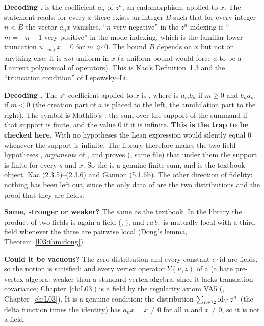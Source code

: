 \begin{dictionary}
\textbf{Decoding .}  is the coefficient $a_n$ of $z^n$, an endomorphism, applied to $x$.
The statement reads: for every $x$ there exists an integer $B$ such that for every integer $n<B$ the vector
$a_nx$ vanishes. ``$n$ very negative'' in the $z^n$-indexing is ``$m=-n-1$ very positive'' in the mode
indexing, which is the familiar lower truncation $u_{(m)}x = 0$ for $m\gg0$. The bound $B$ depends on $x$ but
not on anything else; it is \emph{not} uniform in $x$ (a uniform bound would force $a$ to be a Laurent
polynomial of operators). This is Kac's Definition~1.3 and the ``truncation condition'' of Lepowsky--Li.

\textbf{Decoding .} The $z^s$-coefficient applied to $x$ is
, where  is $a_mb_n$ if $m\ge0$ and
$b_na_m$ if $m<0$ (the creation part of $a$ is placed to the left, the annihilation part to the right).
The symbol  is Mathlib's : the sum over the support of the summand if that support is
finite, and the value $0$ if it is infinite. \textbf{This is the trap to be checked here.} With no hypotheses
the Lean expression would silently equal $0$ whenever the support is infinite. The library therefore makes the two
field hypotheses ,  \emph{arguments} of , and proves
(, same file) that under them the support is finite for every $s$ and $x$.
So the  is a genuine finite sum, and  is the textbook object, Kac (2.3.5)--(2.3.6)
and Gannon (5.1.6b). The other direction of fidelity: nothing has been left out, since the only data of
 are the two distributions and the proof that they are fields.

\textbf{Same, stronger or weaker?} The same as the textbook. In the library the product of two fields is again a
field (, ), and ${:}a\,b{:}$ is mutually
local with a third field whenever the three are pairwise local (Dong's lemma, Theorem~\ref{l03:thm:dong}).

\textbf{Could it be vacuous?} The zero distribution and every constant $c\cdot\mathrm{id}$ are fields, so the
notion is satisfied; and every vertex operator $Y(u,z)$ of a  (a bare pre-vertex algebra: weaker than a standard vertex
algebra, since it lacks translation covariance; Chapter~\ref{ch:L03}) is a field by the regularity axiom
VA5 (, Chapter~\ref{ch:L03}). It is a genuine condition: the distribution $\sum_{n\in\Z}\mathrm{id}_V\,z^n$ (the delta function times the identity) has $a_nx = x\neq0$ for all $n$ and $x\neq0$, so it is not a field.
\end{dictionary}

